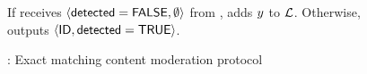 \begin{figure}
{\begin{minipage}[t]{\textwidth}
\item If \client receives $\langle \mathsf{detected} = \mathsf{FALSE}, \emptyset \rangle$ from \server, \client adds $\genericCInputElmt$ to $\mathcal{L}$. Otherwise, \client outputs $\langle \mathsf{ID}, \mathsf{detected} = \mathsf{TRUE} \rangle$. 

\protocolStepListEnd
 

\end{minipage}
} \caption{\protocolEM: Exact matching content moderation protocol \label{fig:exact_match}}
\end{figure}